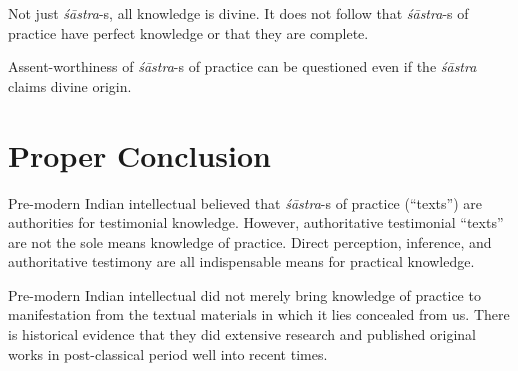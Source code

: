 Not just {\sl śāstra}-s, all knowledge is divine. It does not follow that {\sl śāstra}-s of practice have perfect knowledge or that they are complete.

Assent-worthiness of {\sl śāstra}-s of practice can be questioned even if the {\sl śāstra} claims divine origin.

\section*{Proper Conclusion}

Pre-modern Indian intellectual believed that {\sl śāstra}-s of practice (``texts'') are authorities for testimonial knowledge. However, authoritative testimonial ``texts'' are not the sole means knowledge of practice. Direct perception, inference, and authoritative testimony are all indispensable means for practical knowledge.

Pre-modern Indian intellectual did not merely bring knowledge of practice to manifestation from the textual materials in which it lies concealed from us. There is historical evidence that they did extensive research and published original works in post-classical period well into recent times.

